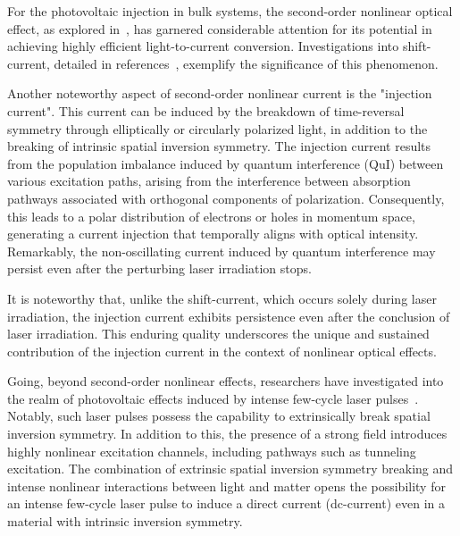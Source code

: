 For the photovoltaic injection in bulk systems, the second-order nonlinear optical effect, as explored in~\cite{PhysRevB.61.5337}, has garnered considerable attention for its potential in achieving highly efficient light-to-current conversion. Investigations into shift-current, detailed in references~\cite{PhysRevLett.107.126805,doi:10.1126/science.1168636,Yang2010,10.1063/5.0101513}, exemplify the significance of this phenomenon.

Another noteworthy aspect of second-order nonlinear current is the "injection
current"\cite{sipe2000second,laman2005ultrafast,
	10.1063/1.125084,PhysRevB.61.5337,10.1063/1.2131191}. This current can be induced by the
breakdown of time-reversal symmetry through elliptically or circularly polarized light, in addition to the
breaking of intrinsic spatial inversion symmetry. The injection current results from the population
imbalance induced by quantum interference (\gls{QuI}) between various excitation paths, arising
from the interference between absorption pathways associated with orthogonal components of
polarization. Consequently, this leads to a polar distribution of electrons or holes in momentum
space, generating a current injection that temporally aligns with optical intensity. Remarkably,
the non-oscillating current induced by quantum interference may persist even after the perturbing
laser irradiation stops.

It is noteworthy that, unlike the shift-current, which occurs solely during laser irradiation, the injection current exhibits persistence even after the conclusion of laser irradiation. This enduring quality underscores the unique and sustained contribution of the injection current in the context of nonlinear optical effects.

Going, beyond second-order nonlinear effects, researchers have investigated into the realm of
photovoltaic effects induced by intense few-cycle laser
pulses~\cite{Schiffrin2013,PhysRevLett.113.087401,PhysRevLett.116.057401,Higuchi2017,Heide_2020,Morimoto_2022}.
Notably, such laser pulses possess the capability to extrinsically break spatial inversion
symmetry. In addition to this, the presence of a strong field introduces highly nonlinear
excitation channels, including pathways such as tunneling excitation. The combination of extrinsic spatial inversion symmetry breaking and intense nonlinear interactions between light and matter opens the possibility for an intense few-cycle laser pulse to induce a direct current (dc-current) even in a material with intrinsic inversion symmetry.


